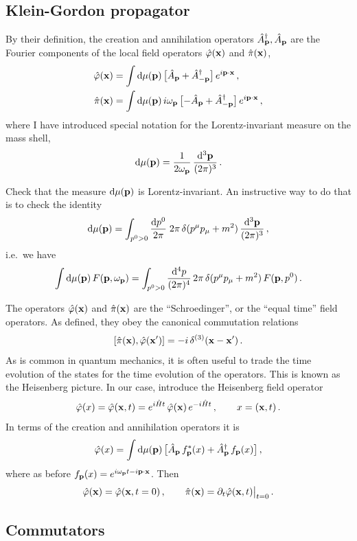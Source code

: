 \subsection*{Klein-Gordon propagator}

By their definition, the creation and annihilation operators
$\hat A^\dagger_{\mathbf{p}},\hat A_{\mathbf{p}}$ are the Fourier components of the local field
operators $\hat\varphi(\mathbf{x})$ and $\hat\pi(\mathbf{x})$,
\begin{align*}
\hat\varphi(\mathbf{x})&=\int \mathop{}\!\mathrm{d}\mu(\mathbf{p})\,\bigl[\hat A_{\mathbf{p}}+\hat A^\dagger_{-\mathbf{p}}\bigr]\,e^{i\mathbf{p}\cdot\mathbf{x}}\,,\\
\hat\pi(\mathbf{x})&=\int \mathop{}\!\mathrm{d}\mu(\mathbf{p})\,i\omega_{\mathbf{p}}\,\bigl[-\hat A_{\mathbf{p}}+\hat A^\dagger_{-\mathbf{p}}\bigr]\,e^{i\mathbf{p}\cdot\mathbf{x}}\,,
\end{align*}
where I have introduced special notation for the Lorentz-invariant measure on
the mass shell,
\[
\mathop{}\!\mathrm{d}\mu(\mathbf{p})=\frac1{2\omega_{\mathbf{p}}}\,\frac{\mathop{}\!\mathrm{d}^3\mathbf{p}}{(2\pi)^3}\,.
\]

\begin{exercise}
Check that the measure $\mathop{}\!\mathrm{d}\mu(\mathbf{p})$ is Lorentz-invariant. An instructive way to
do that is to check the identity
\[
\mathop{}\!\mathrm{d}\mu(\mathbf{p})=\int_{p^0>0}\frac{\mathop{}\!\mathrm{d} p^0}{2\pi}\;2\pi\,\delta(p^\mu p_\mu+m^2)\,\frac{\mathop{}\!\mathrm{d}^3\mathbf{p}}{(2\pi)^3}\,,
\]
i.e.\ we have
\[
\int \mathop{}\!\mathrm{d}\mu(\mathbf{p})\,F(\mathbf{p},\omega_{\mathbf{p}})=\int_{p^0>0}\frac{\mathop{}\!\mathrm{d}^4p}{(2\pi)^4}\,2\pi\,\delta(p^\mu p_\mu+m^2)\,F(\mathbf{p},p^0)\,.
\]
\end{exercise}

The operators $\hat\varphi(\mathbf{x})$ and $\hat\pi(\mathbf{x})$ are the
``Schroedinger'', or the ``equal time'' field operators. As defined, they obey
the canonical commutation relations
\[
[\hat\pi(\mathbf{x}),\hat\varphi(\mathbf{x}')]=-i\,\delta^{(3)}(\mathbf{x}-\mathbf{x}')\,.
\]
As is common in quantum mechanics, it is often useful to trade the time
evolution of the states for the time evolution of the operators. This is known
as the Heisenberg picture. In our case, introduce the Heisenberg field
operator
\[
\hat\varphi(x)=\hat\varphi(\mathbf{x},t)=e^{i\hat Ht}\,\hat\varphi(\mathbf{x})\,e^{-i\hat Ht}\,,\qquad x=(\mathbf{x},t)\,.
\]
In terms of the creation and annihilation operators it is
\[
\hat\varphi(x)=\int \mathop{}\!\mathrm{d}\mu(\mathbf{p})\,\bigl[\hat A_{\mathbf{p}}\,f^*_{\mathbf{p}}(x)+\hat A^\dagger_{\mathbf{p}}\,f_{\mathbf{p}}(x)\bigr]\,,
\]
where as before $f_{\mathbf{p}}(x)=e^{i\omega_{\mathbf{p}} t-i\mathbf{p}\cdot\mathbf{x}}$. Then
\[
\hat\varphi(\mathbf{x})=\hat\varphi(\mathbf{x},t=0)\,,\qquad \hat\pi(\mathbf{x})=\partial_t\hat\varphi(\mathbf{x},t)\big|_{t=0}\,.
\]

\subsection*{Commutators}

